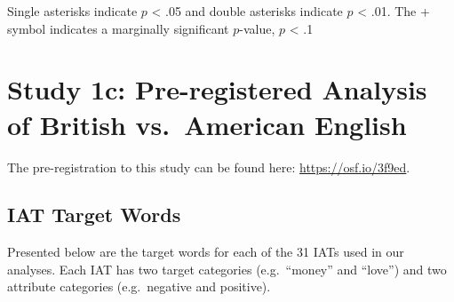 \documentclass[]{article}
\begin{document}
Single asterisks indicate \(p\) \textless{} .05 and double asterisks
indicate \(p\) \textless{} .01. The + symbol indicates a marginally
significant \(p\)-value, \(p\) \textless{} .1

\hypertarget{study-1c-pre-registered-analysis-of-british-vs.-american-english}{%
\section{Study 1c: Pre-registered Analysis of British vs.~American
English}\label{study-1c-pre-registered-analysis-of-british-vs.-american-english}}

The pre-registration to this study can be found here:
\url{https://osf.io/3f9ed}.

\hypertarget{iat-target-words}{%
\subsection{IAT Target Words}\label{iat-target-words}}

Presented below are the target words for each of the 31 IATs used in our
analyses. Each IAT has two target categories (e.g.~``money'' and
``love'') and two attribute categories (e.g.~negative and positive).
\end{document}
